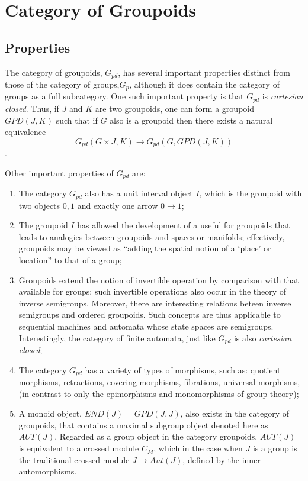 \documentclass[12pt]{article}
\theoremstyle{plain}
\theoremstyle{definition}
\numberwithin{equation}{section}
\begin{document}
\section{Category of Groupoids}

\subsection{Properties}
The category of groupoids, $G_{pd}$, has several important properties distinct from those of the category of groups,\textbf{$G_p$}, although it does contain the category of groups as a full subcategory. One such important property is that $G_{pd}$ is \emph{cartesian closed}. Thus, if $J$ and $K$ are two groupoids, one can form a groupoid $GPD(J,K)$ such that if $G$ also is a groupoid then there exists a natural equivalence 
$$G_{pd}(G \times J, K) \rightarrow G_{pd}(G, GPD(J,K))$$. 
 

Other important properties of $G_{pd}$ are:

\begin{enumerate}

\item The category $G_{pd}$ also has a unit interval object $I$, which is the groupoid with two objects $0,1$ and exactly one arrow $0 \rightarrow 1$;

\item  The groupoid $I$ has allowed the development of a useful 
 for groupoids that leads to analogies between groupoids and spaces or manifolds; effectively, groupoids may be viewed as ``adding the spatial notion of a `place' or location'' to that of a group;

\item Groupoids extend the notion of invertible operation by comparison with that available for groups; such invertible operations also occur in the theory of inverse semigroups. Moreover, there are interesting relations beteen inverse semigroups and ordered groupoids. Such concepts are thus applicable to sequential machines and automata whose state spaces are semigroups. Interestingly, the category of finite automata, just like $G_{pd}$ is also \emph{cartesian closed};

\item The category $G_{pd}$ has a variety of types of morphisms, such as: quotient morphisms, retractions, covering morphisms, fibrations, universal morphisms, (in contrast to only the epimorphisms and monomorphisms of group theory);

\item A monoid object, $END(J)= GPD(J,J)$, also exists in the category of groupoids, that contains a maximal subgroup object denoted here as $AUT(J)$. Regarded as a group object in the category groupoids, $AUT(J)$ is equivalent to a crossed module $C_M$, which in the case when $J$ is a group is the traditional crossed module $J\rightarrow Aut(J)$, defined by the inner automorphisms.

\end{enumerate}
\end{document}

